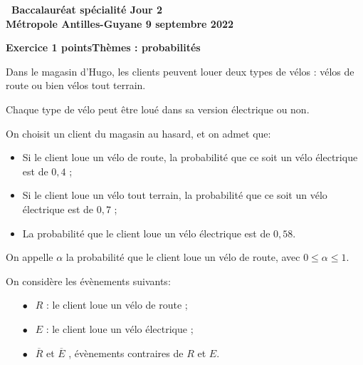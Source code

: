 \documentclass[10pt,a4paper]{article}
\begin{document}
\newpage
\hypertarget{Metropole4}{}

\label{Metropole4}

\pagestyle{fancy}
\thispagestyle{empty}
\begin{center} {\Large \textbf{\decofourleft~Baccalauréat spécialité Jour 2 \decofourright\\[7pt]
Métropole Antilles-Guyane 9 septembre 2022}}
\end{center}

\bigskip

\textbf{Exercice 1  points\hfill Thèmes : probabilités}

\medskip

Dans le magasin d'Hugo, les clients peuvent louer deux types de vélos : vélos de route ou bien vélos tout terrain. 

Chaque type de vélo peut être loué dans sa version électrique ou non.

On choisit un client du magasin au hasard, et on admet que:
\begin{itemize}
\item Si le client loue un vélo de route, la probabilité que ce soit un vélo électrique est de $0,4$ ;
\item Si le client loue un vélo tout terrain, la probabilité que ce soit un vélo électrique est de $0,7$ ; 
\item La probabilité que le client loue un vélo électrique est de $0,58$.
\end{itemize}

\medskip

On appelle $\alpha$ la probabilité que le client loue un vélo de route, avec $0 \leqslant \alpha \leqslant 1$.

On considère les évènements suivants:

\begin{itemize}
\item[$\bullet~~$] $R$ : \og le client loue un vélo de route \fg{} ;
\item[$\bullet~~$] $E$ : \og le client loue un vélo électrique \fg{} ;
\item[$\bullet~~$] $\overline{R}$ et $\overline{E}$ , évènements contraires de $R$ et $E$.
\end{itemize}

\medskip
\end{document}

